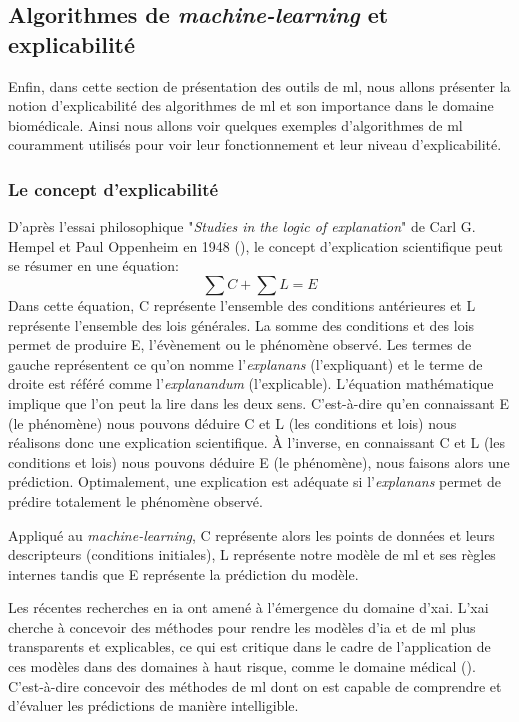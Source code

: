\subsection{Algorithmes de \textit{machine-learning} et explicabilité}
Enfin, dans cette section de présentation des outils de \gls{ml}, nous allons présenter la notion d'explicabilité des algorithmes de \gls{ml} et son importance dans le domaine biomédicale. Ainsi nous allons voir quelques exemples d'algorithmes de \gls{ml} couramment utilisés pour voir leur fonctionnement et leur niveau d'explicabilité.

\subsubsection{Le concept d'explicabilité}
D'après l'essai philosophique "\textit{Studies in the logic of explanation}" de Carl G. Hempel et Paul Oppenheim en 1948 (\cite{hempel_studies_1948}), le concept d'explication scientifique peut se résumer en une équation:
\[\sum C + \sum L = E\]
Dans cette équation, C représente l'ensemble des conditions antérieures et L représente l'ensemble des lois générales. La somme des conditions et des lois permet de produire E, l'évènement ou le phénomène observé. Les termes de gauche représentent ce qu’on nomme l’\textit{explanans} (l’expliquant) et le terme de droite est référé comme l’\textit{explanandum} (l’explicable). L’équation mathématique implique que l’on peut la lire dans les deux sens. C’est-à-dire qu’en connaissant E (le phénomène) nous pouvons déduire C et L (les conditions et lois) nous réalisons donc une explication scientifique. À l’inverse, en connaissant C et L (les conditions et lois) nous pouvons déduire E (le phénomène), nous faisons alors une prédiction. Optimalement, une explication est adéquate si l’\textit{explanans} permet de prédire totalement le phénomène observé.

Appliqué au \textit{machine-learning}, C représente alors les points de données et leurs descripteurs (conditions initiales), L représente notre modèle de \gls{ml} et ses règles internes tandis que E représente la prédiction du modèle.

Les récentes recherches en \gls{ia} ont amené à l'émergence du domaine d'\gls{xai}. L'\gls{xai} cherche à concevoir des méthodes pour rendre les modèles d'\gls{ia} et de \gls{ml} plus transparents et explicables, ce qui est critique dans le cadre de l'application de ces modèles dans des domaines à haut risque, comme le domaine médical (\cite{arrieta_explainable_2019}). C'est-à-dire concevoir des méthodes de \gls{ml} dont on est capable de comprendre et d'évaluer les prédictions de manière intelligible.

